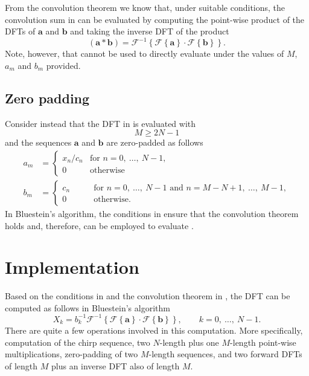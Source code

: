 \documentclass[11pt]{scrartcl}
\begin{document}
From the convolution theorem we know that, under suitable conditions, the convolution sum in  can be evaluated by computing the point-wise product of the DFTs of $\mathbf{a}$ and $\mathbf{b}$ and taking the inverse DFT of the product
\begin{equation}
\left(\mathbf{a} \ast \mathbf{b} \right) = \mathcal{F}^{-1}\left\{ \mathcal{F}\left\{ \mathbf{a} \right\} \cdot \mathcal{F}\left\{ \mathbf{b} \right\} \right\}. \label{eq:convolution_dft}	
\end{equation}
Note, however, that  cannot be used to directly evaluate  under the values of $M$, $a_m$ and $b_m$ provided.  

\subsection{Zero padding}
Consider instead that the DFT in  is evaluated with
\begin{equation}
M \geq 2N-1
\label{eq:bluestein_length_requirement}
\end{equation}
and the sequences $\mathbf{a}$ and $\mathbf{b}$ are zero-padded as follows
\begin{align}
a_m &= \begin{cases} x_n / c_n& \text{for $n = 0, \ \ldots, \ N-1$},\\ 0 & \text{otherwise} \end{cases} \label{eq:first_zero_pad} \\
b_m &= \begin{cases} c_n& \qquad \text{for $n = 0, \ \ldots, \ N-1$ \ and $n = M - N + 1, \ \ldots, \ M - 1$},\\ 0 & \qquad \text{otherwise.} \end{cases}
\label{eq:second_zero_pad}
\end{align}
In Bluestein's algorithm, the conditions in  ensure that the convolution theorem holds and, therefore,  can be employed to evaluate .


\section{Implementation} 
Based on the conditions in  and the convolution theorem in , the DFT can be computed as follows in Bluestein's algorithm
\begin{equation}
X_k = b_k^{-1} \mathcal{F}^{-1}\left\{ \mathcal{F}\left\{ \mathbf{a} \right\} \cdot \mathcal{F}\left\{ \mathbf{b} \right\} \right\}, \qquad k = 0, \ \ldots, \ N-1.
\label{eq:bluestein_final}
\end{equation}
There are quite a few operations involved in this computation. More specifically, computation of the chirp sequence, two $N$-length plus one $M$-length point-wise multiplications, zero-padding of two $M$-length sequences, and two forward DFTs of length $M$ plus an inverse DFT also of length $M$. 
\end{document}
